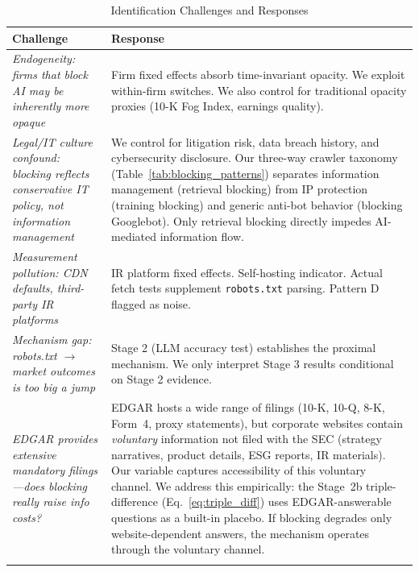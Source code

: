 \documentclass[12pt,a4paper]{article}
\begin{document}
\begin{table}[htbp]
\centering
\caption{Identification Challenges and Responses}
\label{tab:identification}
\small
\begin{tabularx}{\textwidth}{p{3.5cm}X}
\toprule
\textbf{Challenge} & \textbf{Response} \\
\midrule
\textit{Endogeneity: firms that block AI may be inherently more opaque} & Firm fixed effects absorb time-invariant opacity. We exploit within-firm switches. We also control for traditional opacity proxies (10-K Fog Index, earnings quality). \\
\addlinespace
\textit{Legal/IT culture confound: blocking reflects conservative IT policy, not information management} & We control for litigation risk, data breach history, and cybersecurity disclosure. Our three-way crawler taxonomy (Table~\ref{tab:blocking_patterns}) separates information management (retrieval blocking) from IP protection (training blocking) and generic anti-bot behavior (blocking Googlebot). Only retrieval blocking directly impedes AI-mediated information flow. \\
\addlinespace
\textit{Measurement pollution: CDN defaults, third-party IR platforms} & IR platform fixed effects. Self-hosting indicator. Actual fetch tests supplement \texttt{robots.txt} parsing. Pattern D flagged as noise. \\
\addlinespace
\textit{Mechanism gap: robots.txt $\to$ market outcomes is too big a jump} & Stage 2 (LLM accuracy test) establishes the proximal mechanism. We only interpret Stage 3 results conditional on Stage 2 evidence. \\
\addlinespace
\textit{EDGAR provides extensive mandatory filings---does blocking really raise info costs?} & EDGAR hosts a wide range of filings (10-K, 10-Q, 8-K, Form~4, proxy statements), but corporate websites contain \emph{voluntary} information not filed with the SEC (strategy narratives, product details, ESG reports, IR materials). Our variable captures accessibility of this voluntary channel. We address this empirically: the Stage~2b triple-difference (Eq.~\ref{eq:triple_diff}) uses EDGAR-answerable questions as a built-in placebo. If blocking degrades only website-dependent answers, the mechanism operates through the voluntary channel. \\
\addlinespace

\end{tabularx}
\end{table}
\end{document}
